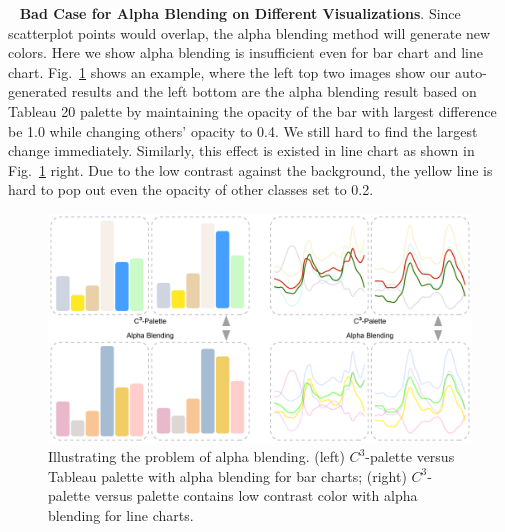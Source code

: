 \documentclass[review,onecolumn]{vgtc}                %
\newcommand{\myparagraph}[1]{\mbox{\ } \newline \noindent \textbf{#1}}
\renewcommand{\paragraph}[1]{\myparagraph{#1}}
\begin{document}
\paragraph{Bad Case for Alpha Blending on Different Visualizations}.
Since scatterplot points would overlap, the alpha blending method will generate new colors. Here we show alpha blending is insufficient even for bar chart and line chart. Fig.~\ref{fig:badcaseAB} shows an example, where the left top two images show our auto-generated results and the left bottom are the alpha blending result based on Tableau 20 palette by maintaining the opacity of the bar with largest difference be 1.0 while changing others' opacity to 0.4. We still hard to find the largest change immediately. Similarly, this effect is existed in line chart as shown in Fig.~\ref{fig:badcaseAB} right. Due to the low contrast against the background, the yellow line is hard to pop out even the opacity of other classes set to 0.2.

\begin{figure}[ht]
\centering
\includegraphics[width=0.96\linewidth]{badcaseAB.pdf}
\caption{Illustrating the problem of alpha blending. (left) $C^3$-palette versus Tableau palette with alpha blending for bar charts; (right) $C^3$-palette versus palette contains low contrast color with alpha blending for line charts.}
\vspace*{-5mm}
\label{fig:badcaseAB}
\end{figure}


\end{document}
